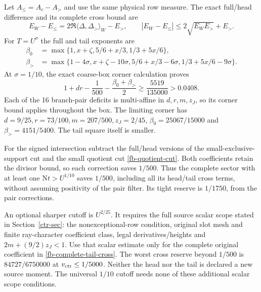 \documentclass[11pt]{article}
\theoremstyle{definition}
\newcommand{\N}{\mathrm N}
\begin{document}
Let $A_\le=A_c-A_>$ and use the same physical row measure.
The exact full/head difference and its complete cross bound are
\begin{equation}\label{fb-complete-tail-cross}
 E_W-E_\le=2\Re\langle\Delta,\Delta_>\rangle_W-E_>,
 \qquad |E_W-E_\le|\le2\sqrt{E_WE_>}+E_>.
\end{equation}
For $T=U^\sigma$ the full and tail exponents are
\begin{align*}
 \beta_0&=\max\{1,x+\zeta,5/6+x/3,1/3+5x/6\},\\
 \beta_>&=\max\{1-4\sigma,x+\zeta-10\sigma,
                     5/6+x/3-6\sigma,1/3+5x/6-9\sigma\}.
\end{align*}
At $\sigma=1/10$, the exact coarse-box corner calculation proves
\begin{equation}\label{fb-native-cross-reserve}
 1+dr-\frac1{500}-\frac{\beta_0+\beta_>}{2}
           \ge\frac{5519}{135000}>0.0408 .
\end{equation}
Each of the 16 branch-pair deficits is multi-affine in
$d,r,m,z_J$, so its corner bound applies throughout the box.
The limiting corner has
$d=9/25,r=73/100,m=207/500,z_J=2/45$,
$\beta_0=25067/15000$ and $\beta_>=4151/5400$.
The tail square itself is smaller.

For the signed intersection subtract the full/head versions of
the small-exclusive-support cut and the small quotient cut
\eqref{fb-quotient-cut}. Both coefficients retain the divisor bound,
so each correction saves $1/500$. Thus the complete sector with
at least one $\N t>U^{1/10}$ saves $1/500$, including all its
head/tail cross terms, without assuming positivity of the pair filter.
Its tight reserve is $1/1750$, from the pair corrections.

An optional sharper cutoff is $U^{2/25}$. It requires the full
source scalar scope stated in Section~\ref{ctr-sec}: the
nonexceptional-row condition, original slot mesh and finite ray-character
coefficient class, legal derivatives/heights and
$2m+(9/2)z_J<1$.
Use that scalar estimate only for the complete original coefficient
in \eqref{fb-complete-tail-cross}. The worst cross reserve beyond
$1/500$ is $84727/6750000$ at $v_{\rm ctr}\le1/5000$.
Neither the head nor the tail is declared a new source moment.
The universal $1/10$ cutoff needs none of these additional scalar
scope conditions.
\end{document}
